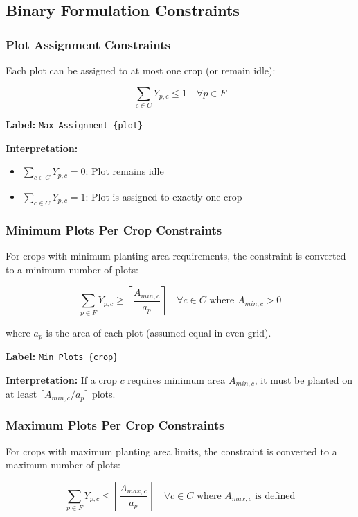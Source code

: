 \documentclass{article}
\begin{document}
\subsection{Binary Formulation Constraints}

\subsubsection{Plot Assignment Constraints}

Each plot can be assigned to at most one crop (or remain idle):

$$\sum_{c \in C} Y_{p,c} \leq 1 \quad \forall p \in F$$

\textbf{Label:} \texttt{Max\_Assignment\_\{plot\}}

\textbf{Interpretation:}
\begin{itemize}
    \item $\sum_{c \in C} Y_{p,c} = 0$: Plot remains idle
    \item $\sum_{c \in C} Y_{p,c} = 1$: Plot is assigned to exactly one crop
\end{itemize}

\subsubsection{Minimum Plots Per Crop Constraints}

For crops with minimum planting area requirements, the constraint is converted to a minimum number of plots:

$$\sum_{p \in F} Y_{p,c} \geq \left\lceil \frac{A_{min,c}}{a_p} \right\rceil \quad \forall c \in C \text{ where } A_{min,c} > 0$$

where $a_p$ is the area of each plot (assumed equal in even grid).

\textbf{Label:} \texttt{Min\_Plots\_\{crop\}}

\textbf{Interpretation:} If a crop $c$ requires minimum area $A_{min,c}$, it must be planted on at least $\lceil A_{min,c} / a_p \rceil$ plots.

\subsubsection{Maximum Plots Per Crop Constraints}

For crops with maximum planting area limits, the constraint is converted to a maximum number of plots:

$$\sum_{p \in F} Y_{p,c} \leq \left\lfloor \frac{A_{max,c}}{a_p} \right\rfloor \quad \forall c \in C \text{ where } A_{max,c} \text{ is defined}$$
\end{document}
